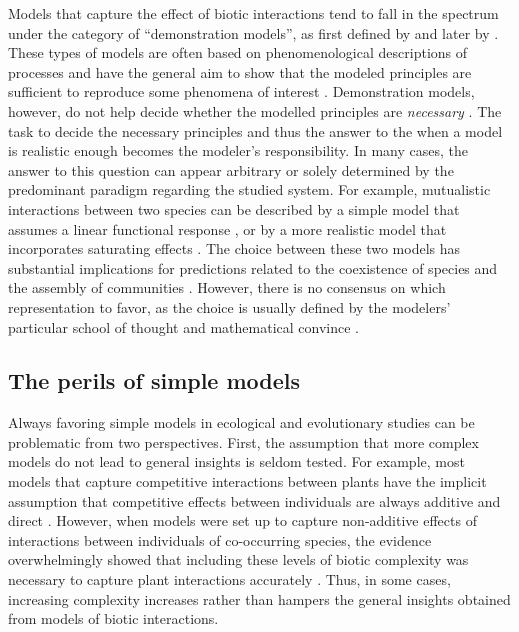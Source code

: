 \begin{refsection}
Models that capture the effect of biotic interactions tend to fall in the spectrum under the category of ``demonstration models'', as first defined by \citep{crick1988mad} and later by \citep{evans2013simple}. These types of models are often based on phenomenological descriptions of processes and have the general aim to show that the modeled principles are sufficient to reproduce some phenomena of interest \citep{crick1988mad,evans2013simple}.  Demonstration models, however, do not help decide whether the modelled principles are \textit{necessary} \citep{evans2013simple}. The task to decide the necessary principles and thus the answer to the when a model is realistic enough becomes the modeler's responsibility. In many cases, the answer to this question can appear arbitrary or solely determined by the predominant paradigm regarding the studied system. For example, mutualistic interactions between two species can be described by a simple model that assumes a linear functional response \citep{bascompte2006asymmetric}, or by a more realistic model that incorporates saturating effects \citep{holland2002population}.  The choice between these two models has substantial implications for predictions related to the coexistence of species and the assembly of communities \citep{holland2002population}. However, there is no consensus on which representation to favor, as the choice is usually defined by the modelers' particular school of thought and mathematical convince \citep{holland2006comment, bascompte2006response}.

\subsection*{The perils of simple models}
Always favoring simple models in ecological and evolutionary studies can be problematic from two perspectives. First, the assumption that more complex models do not lead to general insights is seldom tested. For example, most models that capture competitive interactions between plants have the implicit assumption that competitive effects between individuals are always additive and direct \citep{schoener1974some,freckleton2001predicting,kraft2015plant}.  However, when models were set up to capture non-additive effects of interactions between individuals of co-occurring species, the evidence overwhelmingly showed that including these levels of biotic complexity was necessary to capture plant interactions accurately \citep{mayfield2017higher,martyn2021identifying,lai2021non}.  Thus, in some cases, increasing complexity increases rather than hampers the general insights obtained from models of biotic interactions.


\end{refsection}
